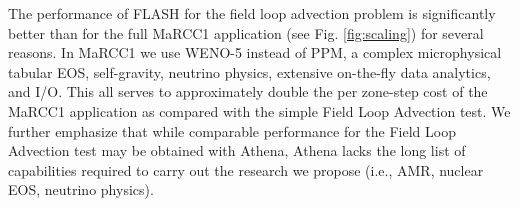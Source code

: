 The performance of FLASH for the field loop advection problem is significantly better than for the full MaRCC1 application (see Fig. \ref{fig:scaling}) for several reasons.  
In MaRCC1 we use WENO-5 instead of PPM, a complex microphysical tabular EOS, self-gravity, neutrino physics, extensive on-the-fly data analytics, and I/O.  
This all serves to approximately double the per zone-step cost of the MaRCC1 application as compared with the simple Field Loop Advection test.
We further emphasize that while comparable performance for the Field Loop Advection test may be obtained with Athena, Athena lacks the long list of capabilities required to carry out the research we propose (i.e., AMR, nuclear EOS, neutrino physics).


